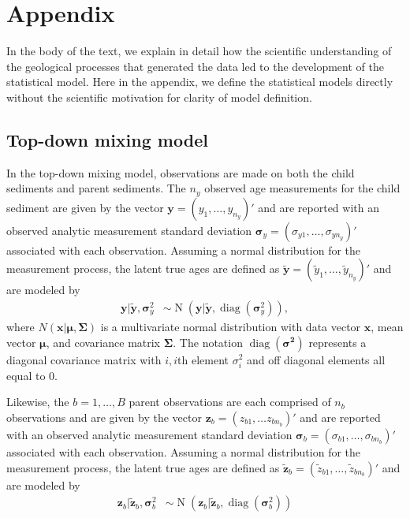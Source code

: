 \section{Appendix}
In the body of the text, we explain in detail how the scientific understanding of the geological processes that generated the data led to the development of the statistical model. Here in the appendix, we define the statistical models directly without the scientific motivation for clarity of model definition. 

\subsection{Top-down mixing model}

In the top-down mixing model, observations are made on both the child sediments and parent sediments. The $n_y$ observed age measurements for the child sediment are given by the vector $\mathbf{y} = (y_1, \ldots, y_{n_y})'$ and are reported with an observed analytic measurement standard deviation $\boldsymbol{\sigma}_y = (\sigma_{y1}, \ldots, \sigma_{yn_y})'$ associated with each observation. Assuming a normal distribution for the measurement process, the latent true ages are defined as $\tilde{\mathbf{y}} = (\tilde{y}_1, \ldots, \tilde{y}_{n_y})'$ and are modeled by 
\begin{align*}
\mathbf{y} | \tilde{\mathbf{y}}, \boldsymbol{\sigma}_y^2 & \sim \operatorname{N} (\mathbf{y} | \tilde{\mathbf{y}}, \operatorname{diag} ( \boldsymbol{\sigma}_y^2 ) ), 
\end{align*}
where $N(\mathbf{x} | \boldsymbol{\mu}, \boldsymbol{\Sigma})$ is a multivariate normal distribution with data vector $\mathbf{x}$, mean vector $\boldsymbol{\mu}$, and covariance matrix $\boldsymbol{\Sigma}$. The notation $\operatorname{diag} (\boldsymbol{\sigma^2})$ represents a diagonal covariance matrix with $i,i$th element $\sigma^2_i$ and off diagonal elements all equal to 0. 

Likewise, the $b = 1, \ldots, B$ parent observations are each comprised of $n_b$ observations and are given by the vector $\mathbf{z}_b = (z_{b1}, \ldots z_{bn_b})'$  and are reported with an observed analytic measurement standard deviation $\boldsymbol{\sigma}_b = (\sigma_{b1}, \ldots, \sigma_{bn_b})'$ associated with each observation. Assuming a normal distribution for the measurement process, the latent true ages are defined as $\tilde{\mathbf{z}}_b = (\tilde{z}_{b1}, \ldots, \tilde{z}_{bn_b})'$ and are modeled by 
\begin{align*}
\mathbf{z}_b | \tilde{\mathbf{z}}_b, \boldsymbol{\sigma}_{b}^2 & \sim \operatorname{N} (\mathbf{z}_b | \tilde{\mathbf{z}}_b, \operatorname{diag} ( \boldsymbol{\sigma}_{b}^2 ) )
\end{align*}

